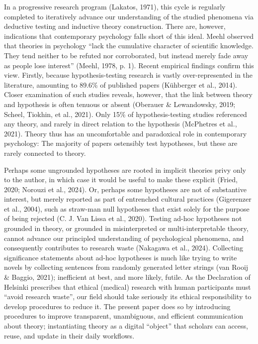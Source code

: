 \documentclass[man]{apa7}
\begin{document}
In a progressive research program (Lakatos, 1971),
this cycle is regularly completed to iteratively advance our understanding of the studied phenomena via deductive testing and inductive theory construction.
There are, however, indications that contemporary psychology falls short of this ideal.
Meehl observed that theories in psychology ``lack the cumulative character of scientific knowledge. They tend neither to be refuted nor corroborated, but instead merely fade away as people lose interest'' (Meehl, 1978, p. 1).
Recent empirical findings confirm this view.
Firstly, because hypothesis-testing research is vastly over-represented in the literature, amounting to 89.6\% of published papers (Kühberger et al., 2014).
Closer examination of such studies reveals, however, that the link between theory and hypothesis is often tenuous or absent (Oberauer \& Lewandowsky, 2019; Scheel, Tiokhin, et al., 2021).
Only 15\% of hypothesis-testing studies referenced any theory,
and rarely in direct relation to the hypothesis (McPhetres et al., 2021).
Theory thus has an uncomfortable and paradoxical role in contemporary psychology:
The majority of papers ostensibly test hypotheses,
but these are rarely connected to theory.

Perhaps some ungrounded hypotheses are rooted in implicit theories privy only to the author,
in which case it would be useful to make these explicit (Fried, 2020; Norouzi et al., 2024).
Or, perhaps some hypotheses are not of substantive interest, but merely reported as part of entrenched cultural practices (Gigerenzer et al., 2004),
such as straw-man null hypotheses that exist solely for the purpose of being rejected (C. J. Van Lissa et al., 2020).
\label{waste}{Testing ad-hoc hypotheses not grounded in theory, or grounded in misinterpreted or multi-interpretable theory,
cannot advance our principled understanding of psychological phenomena,
and consequently contributes to research waste (Nakagawa et al., 2024).
\label{norms}{Collecting significance statements about ad-hoc hypotheses is much like trying to write novels by collecting sentences from randomly generated letter strings (van Rooij \& Baggio, 2021); inefficient at best, and more likely, futile.
As the Declaration of Helsinki prescribes that ethical (medical) research with human participants must ``avoid research waste'',
our field should take seriously its ethical responsibility to develop procedures to reduce it.}}
The present paper does so by introducing procedures to improve transparent, unambiguous, and efficient communication about theory;
instantiating theory as a digital ``object'' that scholars can access, reuse, and update in their daily workflows.
\end{document}
